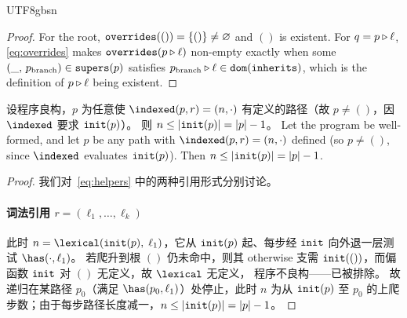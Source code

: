 \begin{CJK*}{UTF8}{gbsn}
\begin{proof}
  For the root, $\mathtt{overrides}(()) = \{()\} \neq \varnothing$ and $()$ is existent. For
  $q = p \mathbin{\triangleright} \ell$, \eqref{eq:overrides} makes $\mathtt{overrides}(p \mathbin{\triangleright} \ell)$ non-empty exactly when
  some $(\_,\, p_{\mathrm{branch}}) \in \mathtt{supers}(p)$ satisfies
  $p_{\mathrm{branch}} \mathbin{\triangleright} \ell \in \mathtt{dom}(\mathtt{inherits})$, which is the definition of $p \mathbin{\triangleright} \ell$
  being existent.
  \fi
\end{proof}

\begin{lemma}\label{lem:db-bound}
  \ifPaperChinese
  设程序良构，$p$ 为任意使 $\indexed(p, r) = (n, \cdot)$ 有定义的路径（故 $p \neq ()$，因 $\indexed$ 要求 $\mathtt{init}(p)$）。
  则 $n \leq |\mathtt{init}(p)| = |p| - 1$。
  \else
  Let the program be well-formed, and let $p$ be any path with $\indexed(p, r) = (n, \cdot)$ defined (so $p \neq ()$, since $\indexed$ evaluates $\mathtt{init}(p)$).
  Then $n \leq |\mathtt{init}(p)| = |p| - 1$.
  \fi
\end{lemma}
\begin{proof}
  \ifPaperChinese
  我们对~\eqref{eq:helpers} 中的两种引用形式分别讨论。

  \paragraph{词法引用 $r = (\ell_1, \ldots, \ell_k)$}
  此时 $n = \lexical(\init(p),\; \ell_1)$，它从 $\mathtt{init}(p)$ 起、每步经 $\mathtt{init}$ 向外退一层测试 $\has(\cdot, \ell_1)$。
  若爬升到根 $()$ 仍未命中，则其 otherwise 支需 $\mathtt{init}(())$，而偏函数 $\mathtt{init}$ 对 $()$ 无定义，故 $\lexical$ 无定义，
  程序不良构——已被排除。
  故递归在某路径 $p_0$（满足 $\has(p_0, \ell_1)$）处停止，此时 $n$ 为从
  $\mathtt{init}(p)$ 至 $p_0$ 的上爬步数；由于每步路径长度减一，$n \leq |\mathtt{init}(p)| = |p| - 1$。


\end{proof}
\end{CJK*}
